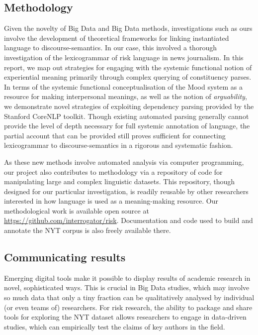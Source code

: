 \documentclass{report}
\begin{document}
\subsection{Methodology}

Given the novelty of Big Data and Big Data methods, investigations such as ours involve the development of theoretical frameworks for linking instantiated language to discourse-semantics. In our case, this involved a thorough investigation of the lexicogrammar of risk language in news journalism. In this report, we map out strategies for engaging with the systemic functional notion of experiential meaning primarily through complex querying of constituency parses. In terms of the systemic functional conceptualisation of the Mood system as a resource for making interpersonal meanings, as well as the notion of \emph{arguability}, we demonstrate novel strategies of exploiting dependency parsing provided by the Stanford CoreNLP toolkit. Though existing automated parsing generally cannot provide the level of depth necessary for full systemic annotation of language, the partial account that can be provided still proves sufficient for connecting lexicogrammar to discourse-semantics in a rigorous and systematic fashion.

As these new methods involve automated analysis via computer programming, our project also contributes to methodology via a repository of code for manipulating large and complex linguistic datasets. This repository, though designed for our particular investigation, is readily reusable by other researchers interested in how language is used as a meaning-making resource. Our methodological work is available open source at \url{https://github.com/interrogator/risk}. Documentation and code used to build and annotate the NYT corpus is also freely available there.

\subsection{Communicating results}

Emerging digital tools make it possible to display results of academic research in novel, sophisticated ways. This is crucial in Big Data studies, which may involve so much data that only a tiny fraction can be qualitatively analysed by individual (or even teams of) researchers. For risk research, the ability to package and share tools for exploring the NYT dataset allows researchers to engage in data-driven studies, which can empirically test the claims of key authors in the field.
\end{document}
